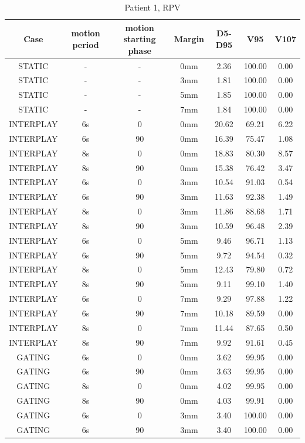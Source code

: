 \documentclass[type=dr, dr=rernat, accentcolor=tud7b,colorbacktitle, bigchapter, openright, twoside, 12pt ]{tudthesis}
\begin{document}
\begin{table}[H]
  \centering
  \caption{Patient 1, RPV}
  \begin{tabular}{|c||c|c|c||c|c|c|}
    \hline\hline
    Case & motion period & motion starting phase & Margin & D5-D95 & V95 & V107\\
    \hline 
STATIC & - & - & 0mm & 2.36 & 100.00 & 0.00 \\
STATIC & - & - & 3mm & 1.81 & 100.00 & 0.00 \\
STATIC & - & - & 5mm & 1.85 & 100.00 & 0.00 \\
STATIC & - & - & 7mm & 1.84 & 100.00 & 0.00 \\
INTERPLAY & 6s & 0 & 0mm & 20.62 & 69.21 & 6.22 \\
INTERPLAY & 6s & 90 & 0mm & 16.39 & 75.47 & 1.08 \\
INTERPLAY & 8s & 0 & 0mm & 18.83 & 80.30 & 8.57 \\
INTERPLAY & 8s & 90 & 0mm & 15.38 & 76.42 & 3.47 \\
INTERPLAY & 6s & 0 & 3mm & 10.54 & 91.03 & 0.54 \\
INTERPLAY & 6s & 90 & 3mm & 11.63 & 92.38 & 1.49 \\
INTERPLAY & 8s & 0 & 3mm & 11.86 & 88.68 & 1.71 \\
INTERPLAY & 8s & 90 & 3mm & 10.59 & 96.48 & 2.39 \\
INTERPLAY & 6s & 0 & 5mm & 9.46 & 96.71 & 1.13 \\
INTERPLAY & 6s & 90 & 5mm & 9.72 & 94.54 & 0.32 \\
INTERPLAY & 8s & 0 & 5mm & 12.43 & 79.80 & 0.72 \\
INTERPLAY & 8s & 90 & 5mm & 9.11 & 99.10 & 1.40 \\
INTERPLAY & 6s & 0 & 7mm & 9.29 & 97.88 & 1.22 \\
INTERPLAY & 6s & 90 & 7mm & 10.18 & 89.59 & 0.00 \\
INTERPLAY & 8s & 0 & 7mm & 11.44 & 87.65 & 0.50 \\
INTERPLAY & 8s & 90 & 7mm & 9.92 & 91.61 & 0.45 \\
GATING & 6s & 0 & 0mm & 3.62 & 99.95 & 0.00 \\
GATING & 6s & 90 & 0mm & 3.63 & 99.95 & 0.00 \\
GATING & 8s & 0 & 0mm & 4.02 & 99.95 & 0.00 \\
GATING & 8s & 90 & 0mm & 4.03 & 99.91 & 0.00 \\
GATING & 6s & 0 & 3mm & 3.40 & 100.00 & 0.00 \\
GATING & 6s & 90 & 3mm & 3.40 & 100.00 & 0.00 \\

\end{tabular}
\end{table}
\end{document}
